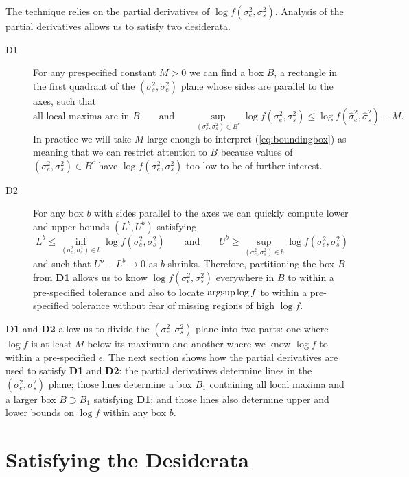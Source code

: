 \documentclass[ejs]{imsart}
\newcommand{\RL}{f}
\newcommand{\logRL}{\log\RL}
\newcommand{\sigssq}{\sigma_s^2}
\newcommand{\sigesq}{\sigma_e^2}
\newcommand{\sshat}{\hat\sigma^2_e,\hat\sigma^2_s}
\newcommand{\logRLss}{\logRL(\sigesq,\sigssq)}
\newcommand{\argsup}{\operatornamewithlimits{argsup}}
\begin{document}
The technique relies on the partial derivatives of $\logRLss$.  Analysis of the partial derivatives allows us to satisfy two desiderata.
\begin{description}
\item[D1] For any prespecified constant $M>0$ we can find a box $B$, a rectangle in the first quadrant of the $(\sigssq, \sigesq)$ plane whose sides are parallel to the axes, such that
\begin{equation}
\label{eq:boundingbox}
	\text{all local maxima are in $B$} \qquad \text{and} \qquad \sup_{(\sigesq, \sigssq) \in B^c} \logRLss \le \logRL(\sshat) - M.
\end{equation}
In practice we will take $M$ large enough to interpret (\ref{eq:boundingbox}) as meaning that we can restrict attention to $B$ because values of $(\sigesq, \sigssq) \in B^c$ have $\logRLss$ too low to be of further interest.

\item[D2] For any box $b$ with sides parallel to the axes we can quickly compute lower and upper bounds $(L^b,U^b)$ satisfying
\begin{equation*}
  L^b \le \inf_{(\sigesq, \sigssq) \in b}\logRLss \qquad\text{and}\qquad
  U^b \ge \sup_{(\sigesq, \sigssq) \in b}\logRLss
\end{equation*}
and such that $U^b-L^b \rightarrow 0$ as $b$ shrinks.  Therefore, partitioning the box $B$ from \textbf{D1} allows us to know $\logRLss$ everywhere in $B$ to within a pre-specified tolerance and also to locate $\argsup\logRL$ to within a pre-specified tolerance without fear of missing regions of high $\logRL$.
\end{description}
\textbf{D1} and \textbf{D2} allow us to divide the $(\sigesq,\sigssq)$ plane into two parts: one where $\logRL$ is at least $M$ below its maximum and another where we know $\logRL$ to within a pre-specified $\epsilon$.  The next section shows how the partial derivatives are used to satisfy \textbf{D1} and \textbf{D2}: the partial derivatives determine lines in the $(\sigesq,\sigssq)$ plane; those lines determine a box $B_1$ containing all local maxima and a larger box $B \supset B_1$ satisfying \textbf{D1}; and those lines also determine upper and lower bounds on $\logRL$ within any box $b$.

\section{Satisfying the Desiderata}
\end{document}
